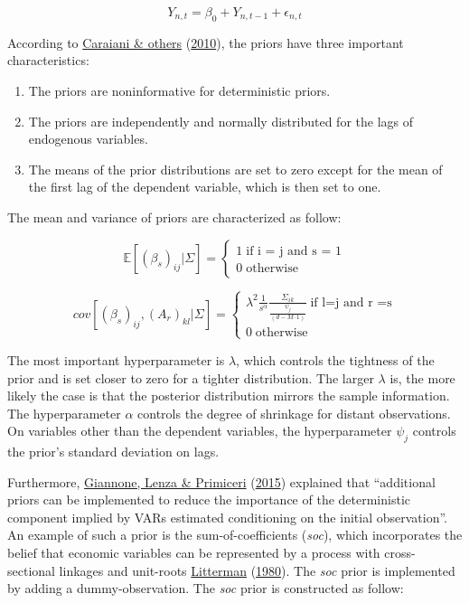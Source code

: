 \documentclass[11pt,preprint, authoryear]{elsarticle}
\numberwithin{equation}{section}
\numberwithin{figure}{section}
\numberwithin{table}{section}
\begin{document}
\begin{equation}
Y_{n,t} = \beta_0 + Y_{n,t-1} + \epsilon_{n,t}
\end{equation}

According to \protect\hyperlink{ref-car2010}{Caraiani \& others}
(\protect\hyperlink{ref-car2010}{2010}), the priors have three important
characteristics:

\begin{enumerate}
\item The priors are noninformative for deterministic priors. 
\item The priors are independently and normally distributed for the lags of endogenous variables. 
\item The means of the prior distributions are set to zero except for the mean of the first lag of the dependent variable, which is then set to one. 
\end{enumerate}

The mean and variance of priors are characterized as follow:

\begin{equation}
\mathbb{E} \left[ (\beta_s)_{ij}|\Sigma  \right] =  
\begin{cases}   
1  \; \text{if i = j and s = 1} \\
0  \; \text{otherwise} 
\end{cases}
\end{equation}

\begin{equation}
cov\left[(\beta_s)_{ij}, (A_r)_{kl}|\Sigma \right] = 
\begin{cases}
\lambda^2\frac{1}{s^{\alpha}}\frac{\Sigma_{ik}}{\frac{\psi_j}{(d -M – 1)}} \; \text{if l=j and r =s} \\
0 \; \text{otherwise}
\end{cases}
\end{equation}

The most important hyperparameter is \(\lambda\), which controls the
tightness of the prior and is set closer to zero for a tighter
distribution. The larger \(\lambda\) is, the more likely the case is
that the posterior distribution mirrors the sample information. The
hyperparameter \(\alpha\) controls the degree of shrinkage for distant
observations. On variables other than the dependent variables, the
hyperparameter \(\psi_j\) controls the prior's standard deviation on
lags.

Furthermore, \protect\hyperlink{ref-2015prior}{Giannone, Lenza \&
Primiceri} (\protect\hyperlink{ref-2015prior}{2015}) explained that
``additional priors can be implemented to reduce the importance of the
deterministic component implied by VARs estimated conditioning on the
initial observation''. An example of such a prior is the
sum-of-coefficients (\emph{soc}), which incorporates the belief that
economic variables can be represented by a process with cross-sectional
linkages and unit-roots \protect\hyperlink{ref-litter}{Litterman}
(\protect\hyperlink{ref-litter}{1980}). The \emph{soc} prior is
implemented by adding a dummy-observation. The \emph{soc} prior is
constructed as follow:
\end{document}

